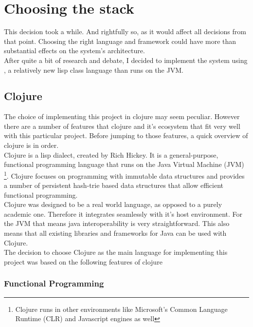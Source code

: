 
\chapter{Choosing the stack} %

\label{ch:stack} %

This decision took a while. And rightfully so, as it would affect all decisions from that point. Choosing the right language and framework could have more than substantial effects on the system's architecture.\\

After quite a bit of research and debate, I decided to implement the system using , a relatively new lisp class language than runs on the JVM.

\section{Clojure}

The choice of implementing this project in clojure may seem peculiar. However there are a number of features that clojure and it's ecosystem that fit very well with this particular project. Before jumping to those features, a quick overview of clojure is in order.\\

Clojure is a lisp dialect, created by Rich Hickey. It is a general-purpose, functional programming language that runs on the Java Virtual Machine (JVM) \footnote{Clojure runs in other environments like Microsoft's Common Language Runtime (CLR) and Javascript engines as well}. Clojure focuses on programming with immutable data structures and provides a number of persistent hash-trie based data structures that allow efficient functional programming.\\

Clojure was designed to be a real world language, as opposed to a purely academic one. Therefore it integrates seamlessly with it's host environment. For the JVM that means java interoperability is very straightforward. This also means that all existing libraries and frameworks for Java can be used with Clojure.\\

The decision to choose Clojure as the main language for implementing this project was based on the
following features of clojure

\subsection{Functional Programming}

